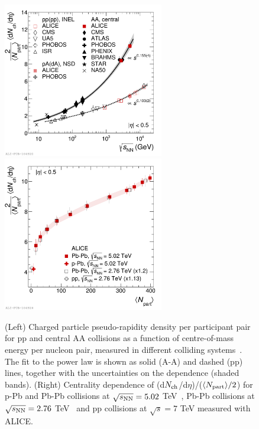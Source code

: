 \begin{figure}[!t]
  \centering
  \includegraphics[width=7cm]{FigCap1/dNchdEtaVsEnergy.pdf}
  \includegraphics[width=7cm]{FigCap1/dNchdEtaVsNpart.pdf}
  \caption{(Left) Charged particle pseudo-rapidity density per participant pair for pp and central AA collisions as a function of centre-of-mass energy per nucleon pair, measured in different colliding systems~\cite{Adam:2015ptt}. The fit to the power law is shown as solid (A-A) and dashed (pp) lines, together with the uncertainties on the dependence (shaded bands). (Right) Centrality dependence of (d$N_{\rm ch}$/d$\eta$)/($\langle N_{\rm part} \rangle/2$) for p-Pb and Pb-Pb collisions at $\sqrt{s_{\rm NN}}=5.02$ TeV~\cite{ALICE:2012xs,Adam:2015gka}, Pb-Pb collisions at $\sqrt{s_{\rm NN}}=2.76$ TeV~\cite{Aamodt:2010cz} and pp collisions at $\sqrt{s}=7$ TeV measured with ALICE.}
  \label{fig:dNchdEta}
\end{figure}

